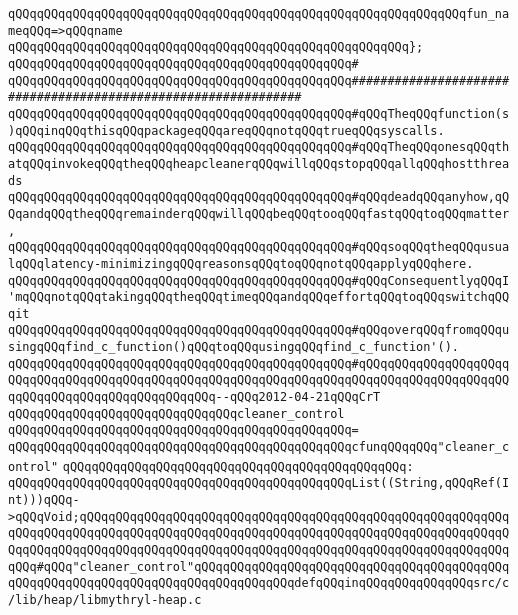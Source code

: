 \verb|qQQqqQQqqQQqqQQqqQQqqQQqqQQqqQQqqQQqqQQqqQQqqQQqqQQqqQQqqQQqqQQqfun_nameqQQq=>qQQqname|\newline
\verb|qQQqqQQqqQQqqQQqqQQqqQQqqQQqqQQqqQQqqQQqqQQqqQQqqQQqqQQq};|\newline
\verb|qQQqqQQqqQQqqQQqqQQqqQQqqQQqqQQqqQQqqQQqqQQqqQQq#|\newline
\verb|qQQqqQQqqQQqqQQqqQQqqQQqqQQqqQQqqQQqqQQqqQQqqQQq###############################################################|\newline
\verb|qQQqqQQqqQQqqQQqqQQqqQQqqQQqqQQqqQQqqQQqqQQqqQQq#qQQqTheqQQqfunction(s)qQQqinqQQqthisqQQqpackageqQQqareqQQqnotqQQqtrueqQQqsyscalls.|\newline
\verb|qQQqqQQqqQQqqQQqqQQqqQQqqQQqqQQqqQQqqQQqqQQqqQQq#qQQqTheqQQqonesqQQqthatqQQqinvokeqQQqtheqQQqheapcleanerqQQqwillqQQqstopqQQqallqQQqhostthreads|\newline
\verb|qQQqqQQqqQQqqQQqqQQqqQQqqQQqqQQqqQQqqQQqqQQqqQQq#qQQqdeadqQQqanyhow,qQQqandqQQqtheqQQqremainderqQQqwillqQQqbeqQQqtooqQQqfastqQQqtoqQQqmatter,|\newline
\verb|qQQqqQQqqQQqqQQqqQQqqQQqqQQqqQQqqQQqqQQqqQQqqQQq#qQQqsoqQQqtheqQQqusualqQQqlatency-minimizingqQQqreasonsqQQqtoqQQqnotqQQqapplyqQQqhere.|\newline
\verb|qQQqqQQqqQQqqQQqqQQqqQQqqQQqqQQqqQQqqQQqqQQqqQQq#qQQqConsequentlyqQQqI'mqQQqnotqQQqtakingqQQqtheqQQqtimeqQQqandqQQqeffortqQQqtoqQQqswitchqQQqit|\newline
\verb|qQQqqQQqqQQqqQQqqQQqqQQqqQQqqQQqqQQqqQQqqQQqqQQq#qQQqoverqQQqfromqQQqusingqQQqfind_c_function()qQQqtoqQQqusingqQQqfind_c_function'().|\newline
\verb|qQQqqQQqqQQqqQQqqQQqqQQqqQQqqQQqqQQqqQQqqQQqqQQq#qQQqqQQqqQQqqQQqqQQqqQQqqQQqqQQqqQQqqQQqqQQqqQQqqQQqqQQqqQQqqQQqqQQqqQQqqQQqqQQqqQQqqQQqqQQqqQQqqQQqqQQqqQQqqQQqqQQqqQQq--qQQq2012-04-21qQQqCrT|\newline
\newline
\newline
\verb|qQQqqQQqqQQqqQQqqQQqqQQqqQQqqQQqcleaner_control|\newline
\verb|qQQqqQQqqQQqqQQqqQQqqQQqqQQqqQQqqQQqqQQqqQQqqQQq=|\newline
\verb|qQQqqQQqqQQqqQQqqQQqqQQqqQQqqQQqqQQqqQQqqQQqqQQqcfunqQQqqQQq"cleaner_control"|\newline
\verb|qQQqqQQqqQQqqQQqqQQqqQQqqQQqqQQqqQQqqQQqqQQqqQQq:|\newline
\verb|qQQqqQQqqQQqqQQqqQQqqQQqqQQqqQQqqQQqqQQqqQQqqQQqList((String,qQQqRef(Int)))qQQq->qQQqVoid;qQQqqQQqqQQqqQQqqQQqqQQqqQQqqQQqqQQqqQQqqQQqqQQqqQQqqQQqqQQqqQQqqQQqqQQqqQQqqQQqqQQqqQQqqQQqqQQqqQQqqQQqqQQqqQQqqQQqqQQqqQQqqQQqqQQqqQQqqQQqqQQqqQQqqQQqqQQqqQQqqQQqqQQqqQQqqQQqqQQqqQQqqQQqqQQqqQQqqQQqqQQq#qQQq"cleaner_control"qQQqqQQqqQQqqQQqqQQqqQQqqQQqqQQqqQQqqQQqqQQqqQQqqQQqqQQqqQQqqQQqqQQqqQQqqQQqqQQqqQQqdefqQQqinqQQqqQQqqQQqqQQqsrc/c/lib/heap/libmythryl-heap.c|\newline
